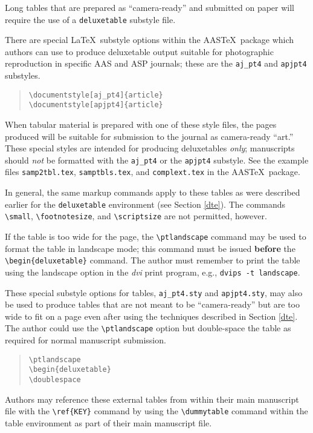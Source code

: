 Long tables that are prepared as ``camera-ready'' and submitted on paper will 
require the use of a {\tt deluxetable} substyle file.

There are special \LaTeX\ substyle options within the AAS\TeX\ package
which authors can use to produce deluxetable output suitable for
photographic reproduction in specific AAS and ASP journals; these are the
\verb"aj_pt4" and \verb"apjpt4" substyles.
\begin{quote}
\verb"\documentstyle[aj_pt4]{article}"\\[.5ex]
\verb"\documentstyle[apjpt4]{article}"
\end{quote}
When tabular material is prepared with one of these style files,
the pages produced will be suitable for submission to the
journal as camera-ready ``art.''
These special styles are intended for producing deluxetables {\sl only\/};
manuscripts should {\sl not\/} be formatted with the \verb"aj_pt4" or
the \verb"apjpt4" substyle.
See the example files {\tt samp2tbl.tex}, {\tt samptbls.tex}, and
{\tt complext.tex} in the AAS\TeX\ package.

In general, the same markup commands apply to these tables as were described 
earlier for the {\tt deluxetable} environment (see Section \ref{dte}).
The commands \verb"\small", \verb"\footnotesize", and \verb"\scriptsize" are 
not permitted, however.

If the table is too wide for the page, the 
\verb"\ptlandscape" command may be used to format the table in landscape
mode; this command must be issued {\bf before} the \verb"\begin{deluxetable}"
command.  The author must remember to print the table using the landscape
option in the {\it dvi} print program, e.g., {\tt dvips -t landscape}.

These special substyle options for tables, {\tt aj\_pt4.sty} and 
{\tt apjpt4.sty}, may also
be used to produce tables that are not meant to be ``camera-ready'' but are
too wide to fit on a page even after using the techniques described in Section 
\ref{dte}.  The author could use the \verb"\ptlandscape" option but
double-space the table as required for normal manuscript submission.
\begin{quote}
\verb"\ptlandscape" \\
\verb"\begin{deluxetable}" \\
\verb"\doublespace"
\end{quote}

Authors may reference these external tables from within their main manuscript
file with the \verb"\ref{KEY}" command by using the \verb"\dummytable" command 
within the table environment as part of their main manuscript file.

